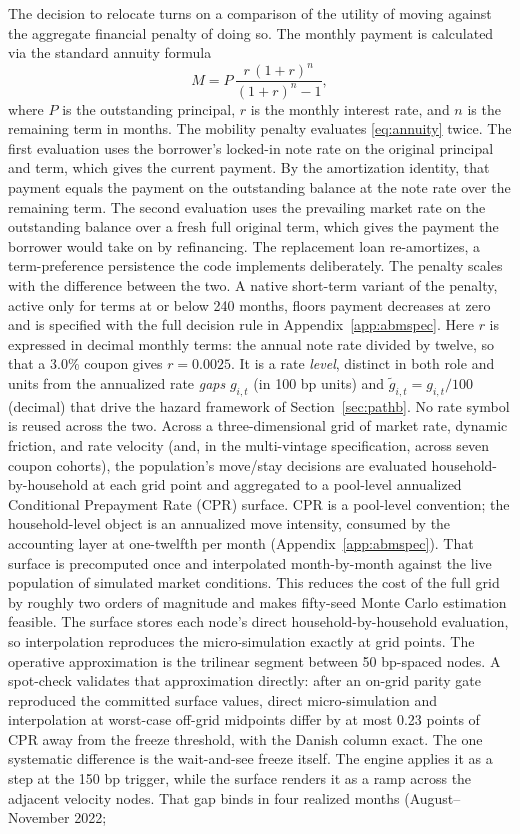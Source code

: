 \documentclass[12pt]{article}
\begin{document}
The decision to relocate turns on a comparison of the utility of moving against the aggregate financial penalty of doing so. The monthly payment is calculated via the standard annuity formula
\begin{equation}\label{eq:annuity}
M = P\,\frac{r\,(1+r)^{n}}{(1+r)^{n}-1},
\end{equation}
where $P$ is the outstanding principal, $r$ is the monthly interest rate, and $n$ is the remaining term in months. The mobility penalty evaluates \eqref{eq:annuity} twice. The first evaluation uses the borrower's locked-in note rate on the original principal and term, which gives the current payment. By the amortization identity, that payment equals the payment on the outstanding balance at the note rate over the remaining term. The second evaluation uses the prevailing market rate on the outstanding balance over a fresh full original term, which gives the payment the borrower would take on by refinancing. The replacement loan re-amortizes, a term-preference persistence the code implements deliberately. The penalty scales with the difference between the two. A native short-term variant of the penalty, active only for terms at or below 240 months, floors payment decreases at zero and is specified with the full decision rule in Appendix~\ref{app:abmspec}. Here $r$ is expressed in decimal monthly terms: the annual note rate divided by twelve, so that a 3.0\% coupon gives $r = 0.0025$. It is a rate \emph{level}, distinct in both role and units from the annualized rate \emph{gaps} $g_{i,t}$ (in 100 bp units) and $\tilde g_{i,t} = g_{i,t}/100$ (decimal) that drive the hazard framework of Section~\ref{sec:pathb}. No rate symbol is reused across the two. Across a three-dimensional grid of market rate, dynamic friction, and rate velocity (and, in the multi-vintage specification, across seven coupon cohorts), the population's move/stay decisions are evaluated household-by-household at each grid point and aggregated to a pool-level annualized Conditional Prepayment Rate (CPR) surface. CPR is a pool-level convention; the household-level object is an annualized move intensity, consumed by the accounting layer at one-twelfth per month (Appendix~\ref{app:abmspec}). That surface is precomputed once and interpolated month-by-month against the live population of simulated market conditions. This reduces the cost of the full grid by roughly two orders of magnitude and makes fifty-seed Monte Carlo estimation feasible. The surface stores each node's direct household-by-household evaluation, so interpolation reproduces the micro-simulation exactly at grid points. The operative approximation is the trilinear segment between 50 bp-spaced nodes. A spot-check validates that approximation directly: after an on-grid parity gate reproduced the committed surface values, direct micro-simulation and interpolation at worst-case off-grid midpoints differ by at most 0.23 points of CPR away from the freeze threshold, with the Danish column exact. The one systematic difference is the wait-and-see freeze itself. The engine applies it as a step at the 150 bp trigger, while the surface renders it as a ramp across the adjacent velocity nodes. That gap binds in four realized months (August--November 2022; 
\end{document}
